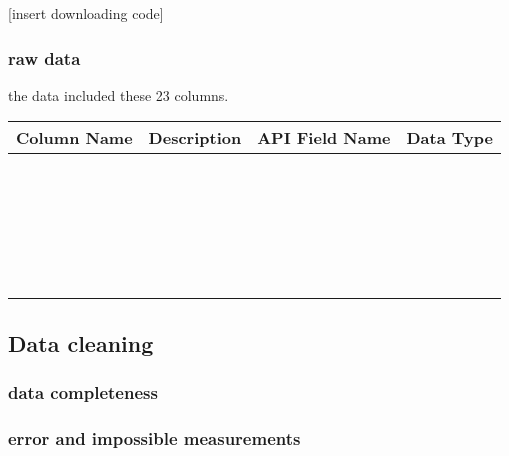 \documentclass[
  letterpaper,
  DIV=11,
  numbers=noendperiod]{scrartcl}
\begin{document}
{[}insert downloading code{]}

\subsubsection{raw data}\label{raw-data}

the data included these 23 columns.

\begin{longtable}[]{@{}llll@{}}
\toprule\noalign{}
Column Name & Description & API Field Name & Data Type \\
\midrule\noalign{}
\endhead
\bottomrule\noalign{}
\endlastfoot
& & & \\
& & & \\
& & & \\
& & & \\
& & & \\
& & & \\
& & & \\
& & & \\
& & & \\
& & & \\
& & & \\
& & & \\
& & & \\
& & & \\
& & & \\
& & & \\
& & & \\
& & & \\
& & & \\
& & & \\
& & & \\
& & & \\
& & & \\
& & & \\
\end{longtable}

\newpage

\newpage

\subsection{Data cleaning}\label{data-cleaning}

\subsubsection{data completeness}\label{data-completeness}

\subsubsection{error and impossible
measurements}\label{error-and-impossible-measurements}
\end{document}
